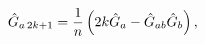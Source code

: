 \begin{equation}
\hat{G}_{a\hspace{0.05cm}2k+1}=
\frac{1}{n}\left(2k\hat{G}_{a}
-\hat{G}_{ab}\hat{G}_{b}\right), 
\end{equation}


